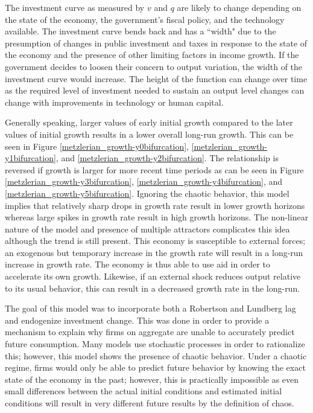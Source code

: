 The investment curve as measured by $v$ and $q$ are likely to change depending on the state of the economy, the government's fiscal policy, and the technology available. The investment curve bends back and has a ``width" due to the presumption of changes in public investment and taxes in response to the state of the economy and the presence of other limiting factors in income growth. If the government decides to loosen their concern to output variation, the width of the investment curve would increase. The height of the function can change over time as the required level of investment needed to sustain an output level changes can change with improvements in technology or human capital. 

Generally speaking, larger values of early initial growth compared to the later values of initial growth results in a lower overall long-run growth. This can be seen in Figure \ref{metzlerian_growth-y0bifurcation}, \ref{metzlerian_growth-y1bifurcation}, and \ref{metzlerian_growth-y2bifurcation}. The relationship is reversed if growth is larger for more recent time periods as can be seen in Figure \ref{metzlerian_growth-y3bifurcation}, \ref{metzlerian_growth-y4bifurcation}, and \ref{metzlerian_growth-y5bifurcation}. Ignoring the chaotic behavior, this model implies that relatively sharp drops in growth rate result in lower growth horizons whereas large spikes in growth rate result in high growth horizons. The non-linear nature of the model and presence of multiple attractors complicates this idea although the trend is still present. This economy is susceptible to external forces; an exogenous but temporary increase in the growth rate will result in a long-run increase in growth rate. The economy is thus able to use aid in order to accelerate its own growth. Likewise, if an external shock reduces output relative to its usual behavior, this can result in a decreased growth rate in the long-run. 

The goal of this model was to incorporate both a Robertson and Lundberg lag and endogenize investment change. This was done in order to provide a mechanism to explain why firms on aggregate are unable to accurately predict future consumption. Many models use stochastic processes in order to rationalize this; however, this model shows the presence of chaotic behavior. Under a chaotic regime, firms would only be able to predict future behavior by knowing the exact state of the economy in the past; however, this is practically impossible as even small differences between the actual initial conditions and estimated initial conditions will result in very different future results by the definition of chaos. 

